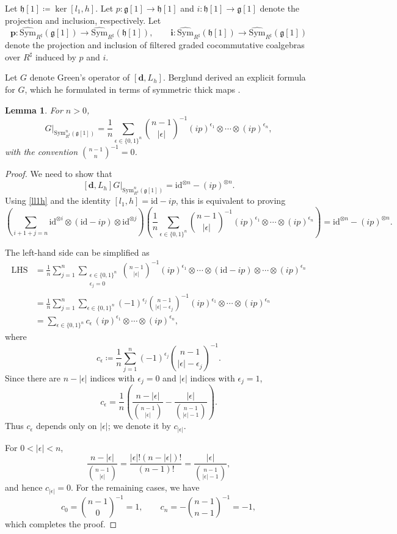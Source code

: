 \documentclass[12pt]{amsart}
\newtheorem{lem}[defn]{Lemma}
\numberwithin{equation}{section}
\theoremstyle{plain}
\newcommand{\bfd}{\mathbf{d}}
\newcommand{\bfi}{\mathbf{i}}
\newcommand{\bfp}{\mathbf{p}}
\newcommand{\fg}{\mathfrak{g}}
\newcommand{\fh}{\mathfrak{h}}
\newcommand{\Sym}{\mathrm{Sym}}
\newcommand{\id}{\mathrm{id}}
\newcommand{\wSym}{\widehat{\Sym}}
\newcommand{\uR}{{R^\sharp}}
\begin{document}
	Let $\fh[1] \coloneqq \ker [l_1,h]$. Let $p\colon \fg[1] \rightarrow \fh[1]$ and $i\colon \fh[1] \rightarrow \fg[1]$ denote the projection and inclusion, respectively. Let 
	\[
	\bfp\colon  \wSym_\uR(\fg[1]) \rightarrow  \wSym_\uR(\fh[1]), \qquad \bfi\colon \wSym_\uR(\fh[1]) \rightarrow   \wSym_\uR(\fg[1])
	\]
	denote the projection and inclusion of filtered graded cocommutative coalgebras over $\uR$ induced by $p$ and $i$. 
	
	Let $G$ denote Green's operator of $[\bfd, L_h]$. 
	Berglund derived an explicit formula for $G$, which he formulated in terms of symmetric thick maps \cite{berglund2014homological}.
	\begin{lem}\label{berg}
		For $n>0$,
		\[
		G\big|_{\Sym_\uR^n(\fg[1])} =\frac{1}{n} \sum_{\epsilon \in \{0,1\}^n} \binom{n-1}{|\epsilon|}^{-1} (ip)^{\epsilon_1} \otimes \cdots \otimes (ip)^{\epsilon_n},
		\]
		with the convention $\binom{n-1}{n}^{-1}=0$.
	\end{lem}
	\begin{proof}
	We need to show that
	\[
	[\bfd,L_h]G\big|_{\Sym_\uR^n(\fg[1])} =\id^{\otimes n}-(ip)^{\otimes n}.
	\]
	Using \eqref{ll1h} and the identity $[l_1,h]=\id-ip$, this is equivalent to proving
	\[
	\left(\sum_{i+1+j=n}
	\id^{\otimes i}\otimes(\id-ip)\otimes\id^{\otimes j}\right)
	\left(
	\frac{1}{n}
	\sum_{\epsilon\in\{0,1\}^n}
	\binom{n-1}{|\epsilon|}^{-1}
	(ip)^{\epsilon_1}\otimes\cdots\otimes(ip)^{\epsilon_n}
	\right)
	=
	\id^{\otimes n}-(ip)^{\otimes n}.
	\]
	
	The left-hand side can be simplified as 
	\begin{align*}
		\mathrm{LHS}
		&=
		\frac1n
		\sum_{j=1}^n
		\sum_{\substack{\epsilon\in\{0,1\}^n \\ \epsilon_j=0}}
		\binom{n-1}{|\epsilon|}^{-1}
		(ip)^{\epsilon_1}\otimes\cdots\otimes(\id-ip)\otimes\cdots\otimes(ip)^{\epsilon_n}\\
		&=
		\frac1n
		\sum_{j=1}^n
		\sum_{\epsilon\in\{0,1\}^n}
		(-1)^{\epsilon_j}
		\binom{n-1}{|\epsilon|-\epsilon_j}^{-1}
		(ip)^{\epsilon_1}\otimes\cdots\otimes(ip)^{\epsilon_n}\\
		&=
		\sum_{\epsilon\in\{0,1\}^n}
		c_\epsilon\,
		(ip)^{\epsilon_1}\otimes\cdots\otimes(ip)^{\epsilon_n},
	\end{align*}
	where
	\[
	c_\epsilon
	\coloneqq
	\frac1n
	\sum_{j=1}^n
	(-1)^{\epsilon_j}
	\binom{n-1}{|\epsilon|-\epsilon_j}^{-1}.
	\]
	Since there are $n-|\epsilon|$ indices with $\epsilon_j=0$ and $|\epsilon|$ indices with $\epsilon_j=1$,
	\[
	c_\epsilon
	=
	\frac1n
	\left(
	\frac{n-|\epsilon|}{\binom{n-1}{|\epsilon|}}
	-
	\frac{|\epsilon|}{\binom{n-1}{|\epsilon|-1}}
	\right).
	\]
	Thus $c_\epsilon$ depends only on $|\epsilon|$; we denote it by $c_{|\epsilon|}$.
	
	For \(0<|\epsilon|<n\),
	\[
	\frac{n-|\epsilon|}{\binom{n-1}{|\epsilon|}}
	=
	\frac{|\epsilon|!(n-|\epsilon|)!}{(n-1)!}
	=
	\frac{|\epsilon|}{\binom{n-1}{|\epsilon|-1}},
	\]
	and hence $c_{|\epsilon|}=0$. For the remaining cases, we have
	\[
	c_0=\binom{n-1}{0}^{-1}=1,
	\qquad
	c_n=-\binom{n-1}{n-1}^{-1}=-1,
	\]
	which completes the proof.
	\end{proof}
	
\end{document}
